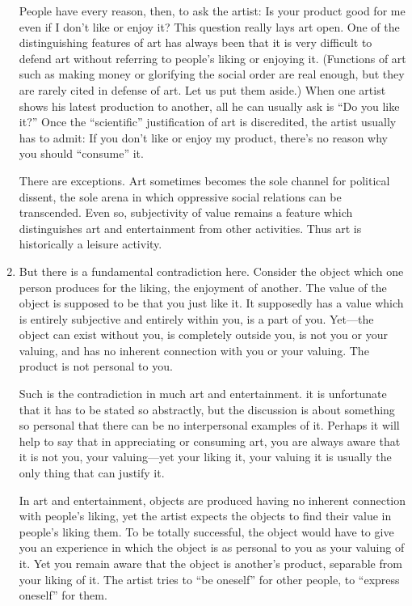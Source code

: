 \begin{enumerate}[label=\textbf{\arabic*.}, wide, itemsep=1em]
People have every reason, then, to ask the artist: Is your product good for 
me even if I don't like or enjoy it? This question really lays art open. One of 
the distinguishing features of art has always been that it is very difficult to 
defend art without referring to people's liking or enjoying it. (Functions of 
art such as making money or glorifying the social order are real enough, but 
they are rarely cited in defense of art. Let us put them aside.) When one 
artist shows his latest production to another, all he can usually ask is \enquote{Do 
you like it?} Once the \enquote{scientific} justification of art is discredited, the 
artist usually has to admit: If you don't like or enjoy my product, there's no 
reason why you should \enquote{consume} it. 

There are exceptions. Art sometimes becomes the sole channel for political 
dissent, the sole arena in which oppressive social relations can be 
transcended. Even so, subjectivity of value remains a feature which 
distinguishes art and entertainment from other activities. Thus art is 
historically a leisure activity. 

\item But there is a fundamental contradiction here. Consider the object which 
one person produces for the liking, the enjoyment of another. The value of 
the object is supposed to be that you just like it. It supposedly has a value 
which is entirely subjective and entirely within you, is a part of you. Yet---the 
object can exist without you, is completely outside you, is not you or your 
valuing, and has no inherent connection with you or your valuing. The 
product is not personal to you. 

Such is the contradiction in much art and entertainment. it is unfortunate 
that it has to be stated so abstractly, but the discussion is about something 
so personal that there can be no interpersonal examples of it. Perhaps it will 
help to say that in appreciating or consuming art, you are always aware that 
it is not you, your valuing---yet your liking it, your valuing it is usually the 
only thing that can justify it. 

In art and entertainment, objects are produced having no inherent 
connection with people's liking, yet the artist expects the objects to find 
their value in people's liking them. To be totally successful, the object would 
have to give you an experience in which the object is as personal to you as 
your valuing of it. Yet you remain aware that the object is another's 
product, separable from your liking of it. The artist tries to \enquote{be oneself} for 
other people, to \enquote{express oneself} for them. 


\end{enumerate}
